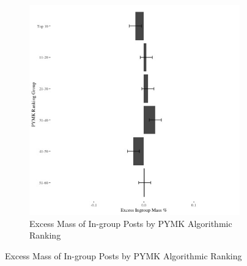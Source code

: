 \documentclass[12pt,letterpaper]{article}
\begin{document}
\begin{figure}[ht]
\begin{subfigure}{.5\textwidth}
        \includegraphics[width=.9\linewidth]{Output/Graphs/Audit/Excess Mass/US PYMK excess mass by ranking group.jpg}  
        \caption{Excess Mass of In-group Posts by PYMK Algorithmic Ranking}
        \label{fig:pymk_bygroup_em}
    \end{subfigure}

\end{figure}
\end{document}
